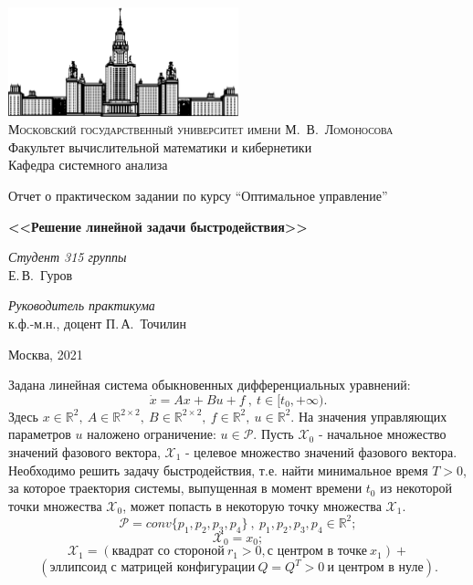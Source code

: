 \documentclass[10pt]{article}
\begin{document}
\thispagestyle{empty}

\begin{center}
\ \vspace{-3cm}

\includegraphics[width=0.5\textwidth]{msu.png}\\
{\scshape Московский государственный университет имени М.~В.~Ломоносова}\\
Факультет вычислительной математики и кибернетики\\
Кафедра системного анализа

\vfill

{\LARGE Отчет о практическом задании по курсу ``Оптимальное управление'' }

\vspace{1cm}

{\Huge\bfseries <<Решение линейной задачи быстродействия>>}
\end{center}

\vspace{1cm}

\begin{flushright}
  \large
  \textit{Студент 315 группы}\\
  Е.\,В.~Гуров

  \vspace{5mm}

  \textit{Руководитель практикума}\\
  к.ф.-м.н., доцент П.\,А.~Точилин
\end{flushright}

\vfill

\begin{center}
Москва, 2021
\end{center}
\newpage

Задана линейная система обыкновенных дифференциальных уравнений:\\
\[ \dot{x} = Ax + Bu + f  \  , \ t \in [t_0, +\infty).\]
Здесь \(x \in \mathbb{R}^2, \ A \in \mathbb{R}^{2 \times 2}, \ B \in \mathbb{R}^{2 \times 2}, \ f \in \mathbb{R}^2, \ u \in \mathbb{R}^2 .\) На значения управляющих параметров \(u\) наложено ограничение: \(u \in \mathcal{P}.\) Пусть \( \mathcal{X}_0\) - начальное множество значений фазового вектора, \(\mathcal{X}_1\) - целевое множество значений фазового вектора. Необходимо решить задачу быстродействия, т.е. найти минимальное время \(T > 0\), за которое траектория системы, выпущенная в момент времени \(t_0\) из некоторой точки множества \(\mathcal{X}_0\), может попасть в некоторую точку множества \(\mathcal{X}_1\).
\bigskip
\[ \mathcal{P} = conv\{p_1, p_2, p_3, p_4\} \ , \ p_1, p_2, p_3, p_4 \in \mathbb{R}^2;\]
\[\mathcal{X}_0 = {x_0};\]
\[\mathcal{X}_1 = (\text{квадрат со стороной} \ r_1 > 0, \text{с центром в точке} \ x_1) + \] 
\[(\text{эллипсоид с матрицей конфигурации} \ Q = Q^T > 0  \ \text{и центром в нуле}).  \]
\end{document}
